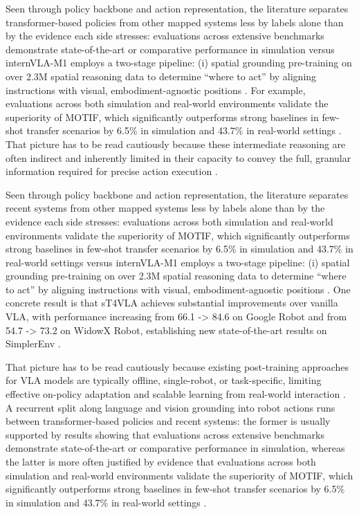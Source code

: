 \documentclass[a4paper,11pt]{article}
\begin{document}
Seen through policy backbone and action representation, the literature separates transformer-based policies from other mapped systems less by labels alone than by the evidence each side stresses: evaluations across extensive benchmarks demonstrate state-of-the-art or comparative performance in simulation versus internVLA-M1 employs a two-stage pipeline: (i) spatial grounding pre-training on over 2.3M spatial reasoning data to determine ``where to act'' by aligning instructions with visual, embodiment-agnostic positions \citep{Zheng2025Soft,Hou2025Dita,Chen2025Internvla,Sridhar2025Ricl}. For example, evaluations across both simulation and real-world environments validate the superiority of MOTIF, which significantly outperforms strong baselines in few-shot transfer scenarios by 6.5\% in simulation and 43.7\% in real-world settings \citep{Zhi2026Motif}. That picture has to be read cautiously because these intermediate reasoning are often indirect and inherently limited in their capacity to convey the full, granular information required for precise action execution \citep{Zhong2026Acot}.

Seen through policy backbone and action representation, the literature separates recent systems from other mapped systems less by labels alone than by the evidence each side stresses: evaluations across both simulation and real-world environments validate the superiority of MOTIF, which significantly outperforms strong baselines in few-shot transfer scenarios by 6.5\% in simulation and 43.7\% in real-world settings versus internVLA-M1 employs a two-stage pipeline: (i) spatial grounding pre-training on over 2.3M spatial reasoning data to determine ``where to act'' by aligning instructions with visual, embodiment-agnostic positions \citep{Zhi2026Motif,Ye2026St4Vla,Chen2025Internvla,Sridhar2025Ricl}. One concrete result is that sT4VLA achieves substantial improvements over vanilla VLA, with performance increasing from 66.1 -> 84.6 on Google Robot and from 54.7 -> 73.2 on WidowX Robot, establishing new state-of-the-art results on SimplerEnv \citep{Ye2026St4Vla}.

That picture has to be read cautiously because existing post-training approaches for VLA models are typically offline, single-robot, or task-specific, limiting effective on-policy adaptation and scalable learning from real-world interaction \citep{Pan2026Scalable}. A recurrent split along language and vision grounding into robot actions runs between transformer-based policies and recent systems: the former is usually supported by results showing that evaluations across extensive benchmarks demonstrate state-of-the-art or comparative performance in simulation, whereas the latter is more often justified by evidence that evaluations across both simulation and real-world environments validate the superiority of MOTIF, which significantly outperforms strong baselines in few-shot transfer scenarios by 6.5\% in simulation and 43.7\% in real-world settings \citep{Zheng2025Soft,Hou2025Dita,Zhi2026Motif,Ye2026St4Vla}.
\end{document}
